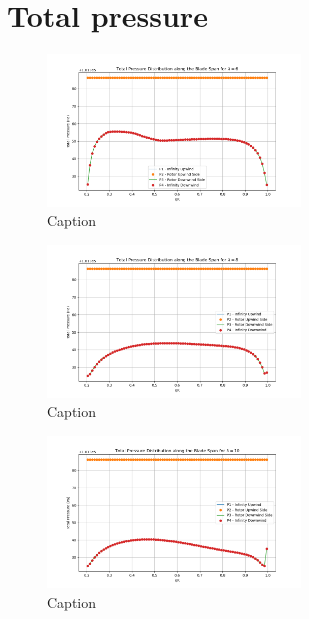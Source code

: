 \section{Total pressure}
\begin{figure}[H]
    \centering
    \includegraphics[width=0.6\textwidth]{Figures/pres_total_6.png}
    \caption{Caption}
    \label{fig:enter-label}
\end{figure}
\begin{figure}[H]
    \centering
    \includegraphics[width=0.6\textwidth]{Figures/pres_total_8.png}
    \caption{Caption}
    \label{fig:enter-label}
\end{figure}
\begin{figure}[H]
    \centering
    \includegraphics[width=0.6\textwidth]{Figures/pres_total_10.png}
    \caption{Caption}
    \label{fig:enter-label}
\end{figure}

